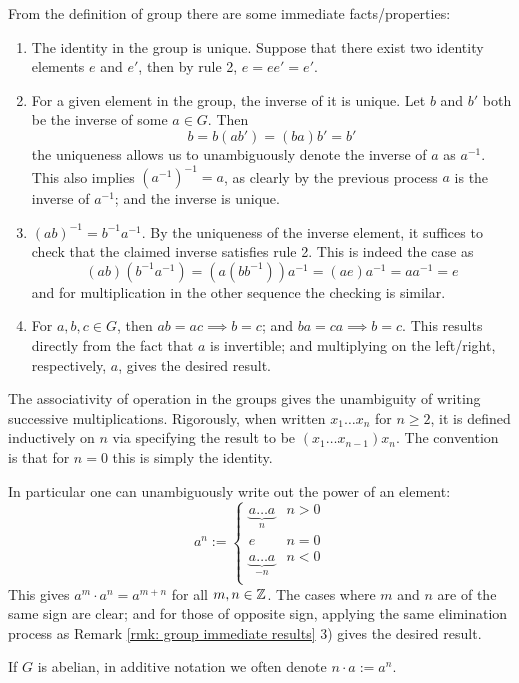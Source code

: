 \documentclass{article}
\begin{document}
\begin{remark}\label{rmk: group immediate results}
    From the definition of group there are some immediate facts/properties:
    \begin{enumerate}[label=\arabic*)]
        \item The identity in the group is unique. Suppose that there exist two identity elements $e$ and $e'$, then by rule 2, $e = ee' = e'$.
        \item For a given element in the group, the inverse of it is unique. Let $b$ and $b'$ both be the inverse of some $a \in G$. Then
        \[
            b = b(ab') = (ba)b' = b'    
        \]
        the uniqueness allows us to unambiguously denote the inverse of $a$ as $a^{-1}$. This also implies $(a^{-1})^{-1} = a$, as clearly by the previous process $a$ is the inverse of $a^{-1}$; and the inverse is unique.
        \item $(ab)^{-1} = b^{-1} a^{-1}$. By the uniqueness of the inverse element, it suffices to check that the claimed inverse satisfies rule 2. This is indeed the case as
        \[
            (ab)(b^{-1}a^{-1}) = (a(bb^{-1}))a^{-1} = (ae)a^{-1} = aa^{-1} = e
        \]
        and for multiplication in the other sequence the checking is similar. 
        \item For $a, b, c \in G$, then $ab = ac \implies b = c$; and $ba = ca \implies b = c$. This results directly from the fact that $a$ is invertible; and multiplying on the left/right, respectively, $a$, gives the desired result.
    \end{enumerate}
\end{remark}

\begin{remark}\label{rmk: Z to group element}
    The associativity of operation in the groups gives the unambiguity of writing successive multiplications. Rigorously, when written $x_1\ldots x_n$ for $n \geq 2$, it is defined inductively on $n$ via specifying the result to be $(x_1\ldots x_{n-1})x_n$. The convention is that for $n = 0$ this is simply the identity.

    In particular one can unambiguously write out the power of an element:
    \[
        a^n := \begin{cases}
            \underbrace{a\ldots a}_{n}  & n > 0 \\
            e                           & n = 0 \\
            \underbrace{a\ldots a}_{-n} & n < 0 \\
        \end{cases}
    \]
    This gives $a^m \cdot a^n = a^{m + n}$ for all $m, n \in \mathbb{Z}$. The cases where $m$ and $n$ are of the same sign are clear; and for those of opposite sign, applying the same elimination process as Remark \ref{rmk: group immediate results} 3) gives the desired result.

    If $G$ is abelian, in additive notation we often denote $n \cdot a := a^n$.
\end{remark}
\end{document}
